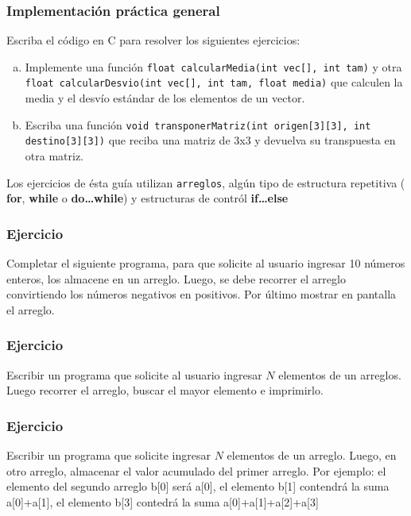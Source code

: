 \begin{ejercicioClase}
    \subsubsection{Implementación práctica general}
    Escriba el código en C para resolver los siguientes ejercicios:
    \begin{enumerate}[a)]
        \item Implemente una función \texttt{float calcularMedia(int vec[], int tam)} y otra \texttt{float calcularDesvio(int vec[], int tam, float media)} que calculen la media y el desvío estándar de los elementos de un vector.
        \item Escriba una función \texttt{void transponerMatriz(int origen[3][3], int destino[3][3])} que reciba una matriz de 3x3 y devuelva su transpuesta en otra matriz.
    \end{enumerate}
\end{ejercicioClase}

Los ejercicios de ésta guía utilizan \texttt{arreglos}, algún tipo de estructura repetitiva ( \textbf{for}, \textbf{while} o \textbf{do\dots while})
y estructuras de contról \textbf{if\dots else}

\subsubsection{Ejercicio}
Completar el siguiente programa, para que solicite al usuario ingresar 10 números enteros, los almacene en un arreglo. Luego, se debe recorrer el arreglo convirtiendo los números negativos en positivos. Por último mostrar en pantalla el arreglo.
\lstset{inputencoding=utf8/latin1}

{\small
  \lstset{inputencoding=utf8/latin1}
  
}

\subsubsection{Ejercicio}
Escribir un programa que solicite al usuario ingresar $N$ elementos de un arreglos. Luego recorrer el arreglo, buscar el mayor elemento e imprimirlo.
{\small
  \lstset{inputencoding=utf8/latin1}
  
}

\subsubsection{Ejercicio}
Escribir un programa que solicite ingresar $N$ elementos de un arreglo. Luego, en otro arreglo, almacenar el valor acumulado del primer arreglo. Por ejemplo: el elemento del segundo arreglo b[0] será a[0], el elemento b[1] contendrá la suma a[0]+a[1], el elemento b[3] contedrá la suma a[0]+a[1]+a[2]+a[3]
{\small
  \lstset{inputencoding=utf8/latin1}
  
}

